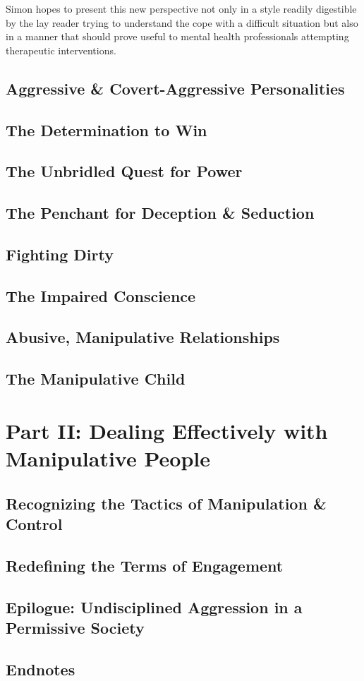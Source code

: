 \documentclass[oneside]{book}
\numberwithin{equation}{section}
\begin{document}
Simon hopes to present this new perspective not only in a style readily digestible by the lay reader trying to understand the cope with a difficult situation but also in a manner that should prove useful to mental health professionals attempting therapeutic interventions.

\section{Aggressive \& Covert-Aggressive Personalities}

\section{The Determination to Win}

\section{The Unbridled Quest for Power}

\section{The Penchant for Deception \& Seduction}

\section{Fighting Dirty}

\section{The Impaired Conscience}

\section{Abusive, Manipulative Relationships}

\section{The Manipulative Child}

\chapter*{Part II: Dealing Effectively with Manipulative People}

\section{Recognizing the Tactics of Manipulation \& Control}

\section{Redefining the Terms of Engagement}

\section{Epilogue: Undisciplined Aggression in a Permissive Society}

\section{Endnotes}


\printbibliography[heading=bibintoc]
\end{document}
